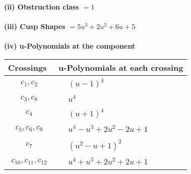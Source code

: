 \documentclass[1p]{elsarticle_modified}
\theoremstyle{definition}
\begin{document}
\flushleft \textbf{(ii) Obstruction class $= 1$}\\~\\
\flushleft \textbf{(iii) Cusp Shapes $= 5 u^3+2 u^2+6 u+5$}\\~\\
\newpage\renewcommand{\arraystretch}{1}
\flushleft \textbf{(iv) u-Polynomials at the component}\newline \\
\begin{tabular}{m{50pt}|m{274pt}}
Crossings & \hspace{64pt}u-Polynomials at each crossing \\
\hline $$\begin{aligned}c_{1},c_{2}\end{aligned}$$&$\begin{aligned}
&(u-1)^4
\end{aligned}$\\
\hline $$\begin{aligned}c_{3},c_{8}\end{aligned}$$&$\begin{aligned}
&u^4
\end{aligned}$\\
\hline $$\begin{aligned}c_{4}\end{aligned}$$&$\begin{aligned}
&(u+1)^4
\end{aligned}$\\
\hline $$\begin{aligned}c_{5},c_{6},c_{9}\end{aligned}$$&$\begin{aligned}
&u^4- u^3+2 u^2-2 u+1
\end{aligned}$\\
\hline $$\begin{aligned}c_{7}\end{aligned}$$&$\begin{aligned}
&(u^2- u+1)^2
\end{aligned}$\\
\hline $$\begin{aligned}c_{10},c_{11},c_{12}\end{aligned}$$&$\begin{aligned}
&u^4+u^3+2 u^2+2 u+1
\end{aligned}$\\
\hline
\end{tabular}\\~\\
\end{document}
